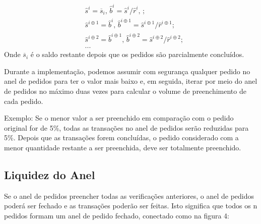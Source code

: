 \documentclass[UTF8,nofonts]{article}
\makeatletter
\newenvironment{figurehere}
 {\def\@captype{figure}}
 {}
\makeatother
\begin{document}
\begin{multicols}{2}
\[
\begin{split}
&\hat{s}^{i}=\overline{s}_i\text{, } \hat{b}^{i}=\hat{s}^{i}/ \hat{r}^i\text{, }\text{;}\\
&\hat{s}^{i\oplus 1}=\hat{b}^i\text{, } \hat{b}^{i\oplus 1}=\hat{s}^{i\oplus 1}/ \hat{r}^{i\oplus 1}\text{;}\\
&\hat{s}^{i\oplus 2}=\hat{b}^{i\oplus 1}\text{, } \hat{b}^{i\oplus 2}=\hat{s}^{i\oplus 2}/ \hat{r}^{i\oplus 2}\text{;}\\
& ...
\end{split}
\]
Onde $\overline{s}_i$  é o saldo restante depois que os pedidos são parcialmente concluídos.

Durante a implementação, podemos assumir com segurança qualquer pedido no anel de pedidos para ter o valor mais baixo e, em seguida, iterar por meio do anel de pedidos no máximo duas vezes para calcular o volume de preenchimento de cada pedido. 

Exemplo: Se o menor valor a ser preenchido em comparação com o pedido original for de 5\%, todas as transações no anel de pedidos serão reduzidas para 5\%. Depois que as transações forem concluídas, o pedido considerado com a menor quantidade restante a ser preenchida, deve ser totalmente preenchido.


\subsection{Liquidez do Anel\label{sec:settlement}}

Se o anel de pedidos preencher todas as verificações anteriores, o anel de pedidos poderá ser fechado e as transações poderão ser feitas. Isto significa que todos os n pedidos formam um anel de pedido fechado, conectado como na figura 4:


\begin{center}
\begin{figurehere}
\centering
{}
\end{figurehere}
\end{center}
\end{multicols}
\end{document}
